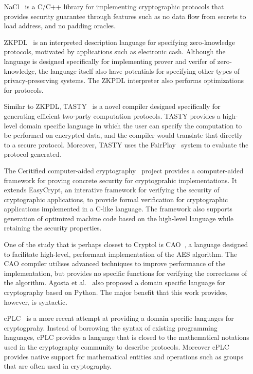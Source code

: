 \documentclass[a4paper, notitlepage]{report}
\begin{document}
NaCl~\cite{bernstein2012security} is a C/C++ library for implementing 
cryptographic protocols that 
provides security guarantee through features such as no data flow from 
secrets to load address, and no padding oracles. 

ZKPDL~\cite{meiklejohn2010zkpdl} is an interpreted description language 
for specifying zero-knowledge protocols, motivated by applications such
as electronic cash. Although the language is designed specifically for
implementing prover and verifer of zero-knowledge, the language itself 
also have potentials for specifying other types of privacy-preserving 
systems. The ZKPDL interpreter also performs optimizations for protocols.

Similar to ZKPDL, TASTY~\cite{henecka2010tasty} is a novel compiler
designed specifically for generating efficient two-party computation
protocols. TASTY provides a high-level domain specific language in which
the user can specify the computation to be performed on encrypted data, 
and the compiler would translate that directly to a secure protocol.
Moreover, TASTY uses the FairPlay~\cite{malkhi2004fairplay} system to
evaluate the protocol generated.

The Ceritified computer-aided cryptography~\cite{almeida2013certified} 
project provides a computer-aided framework for proving concrete security for
 cryptogprahic implementations. It extends EasyCrypt, an interative framework
for verifying the security of cryptographic applications, to
provide formal verification for cryptographic applications implemented 
in a C-like language. The framework also supports generation of 
optimized machine code based on the high-level language while
retaining the security properties.

One of the study that is perhaps closest to Cryptol is 
CAO~\cite{moss2010bridging}, a language designed to facilitate high-level,
performant implementation of the AES algorithm. The CAO compiler utilises
advanced techniques to improve performance of the implementation, but 
provides no specific functions for verifying the correctness of the algorithm.
Agosta et al.~\cite{agosta2007domain} also proposed a domain specific language
for cryptography based on Python. The major benefit that this work provides,
however, is syntactic.

cPLC~\cite{bangerter2011cplc} is a more recent attempt at providing a domain
specific languages for cryptogprahy. Instead of borrowing the syntax of existing
programming languages, cPLC provides a language that is closed to the 
mathematical notations used in the cryptography community to describe 
protocols. Moreover cPLC provides native support for mathematical entities
and operations such as groups that are often used in cryptography.
\end{document}
